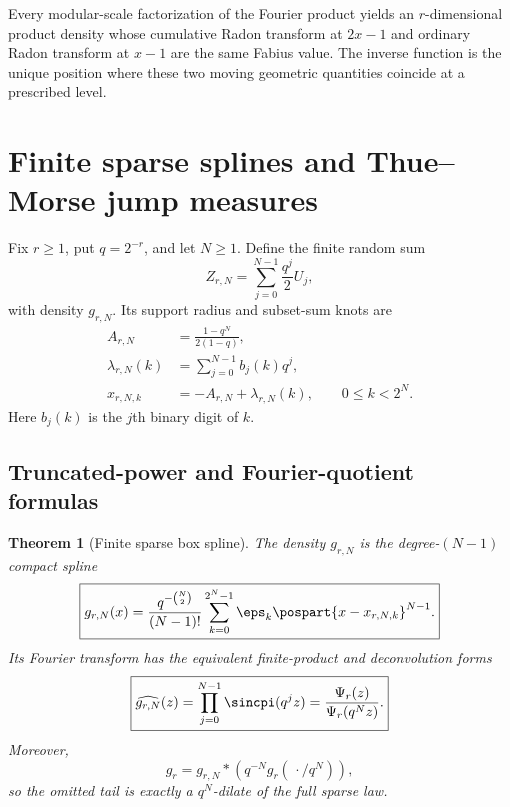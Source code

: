 \documentclass[11pt,oneside]{article}
\newtheorem{theorem}{Theorem}[section]
\theoremstyle{definition}
\begin{document}
\begin{resultbox}
Every modular-scale factorization of the Fourier product yields an
$r$-dimensional product density whose cumulative Radon transform at $2x-1$ and
ordinary Radon transform at $x-1$ are the same Fabius value.  The inverse
function is the unique position where these two moving geometric quantities
coincide at a prescribed level.
\end{resultbox}

\section{Finite sparse splines and Thue--Morse jump measures}
\label{p2:sec:jump-measures}

Fix $r\ge1$, put $q=2^{-r}$, and let $N\ge1$.  Define the finite random sum
\begin{equation}
 Z_{r,N}=\sum_{j=0}^{N-1}\frac{q^j}{2}U_j,                 \label{p2:eq:ZrN}
\end{equation}
with density $g_{r,N}$.  Its support radius and subset-sum knots are
\begin{align}
 A_{r,N}&=\frac{1-q^N}{2(1-q)},                            \label{p2:eq:ArN}\\
 \lambda_{r,N}(k)&=\sum_{j=0}^{N-1}b_j(k)q^j,             \label{p2:eq:lambda-rNk}\\
 x_{r,N,k}&=-A_{r,N}+\lambda_{r,N}(k),
 \qquad 0\le k<2^N.                                      \label{p2:eq:x-rNk}
\end{align}
Here $b_j(k)$ is the $j$th binary digit of $k$.

\subsection{Truncated-power and Fourier-quotient formulas}

\begin{theorem}[Finite sparse box spline]
\label{p2:thm:sparse-box-spline}
The density $g_{r,N}$ is the degree-$(N-1)$ compact spline
\begin{equation}
 \boxed{\displaystyle
 g_{r,N}(x)=\frac{q^{-\binom N2}}{(N-1)!}
 \sum_{k=0}^{2^N-1}\eps_k\pospart{x-x_{r,N,k}}^{N-1}.}    \label{p2:eq:sparse-truncated-power}
\end{equation}
Its Fourier transform has the equivalent finite-product and deconvolution
forms
\begin{equation}
 \boxed{\displaystyle
 \widehat{g_{r,N}}(z)
 =\prod_{j=0}^{N-1}\sincpi(q^jz)
 =\frac{\Psi_r(z)}{\Psi_r(q^Nz)}.}                        \label{p2:eq:g-rN-Fourier}
\end{equation}
Moreover,
\begin{equation}
 g_r=g_{r,N}*\left(q^{-N}g_r(\,\cdot/q^N)\right),         \label{p2:eq:exact-tail-convolution}
\end{equation}
so the omitted tail is exactly a $q^N$-dilate of the full sparse law.
\end{theorem}
\end{document}
